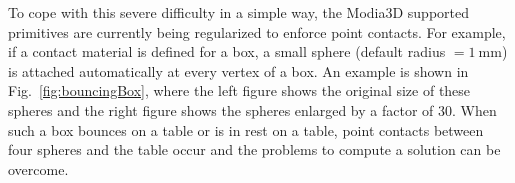 To cope with this severe difficulty in a simple way, the Modia3D supported primitives are currently being
regularized to enforce point contacts. For example, if a contact material is defined for a box, a small sphere
(default radius $= \SI{1}{\milli \meter}$) is attached automatically at every vertex of a box. An example is shown in 
Fig.~\ref{fig:bouncingBox}, where the left figure shows the original size of these spheres and the
right figure shows the spheres enlarged by a factor of 30. When such a box bounces on a table or is in rest
on a table, point contacts between four spheres and the table occur and the problems
to compute a solution can be overcome.
